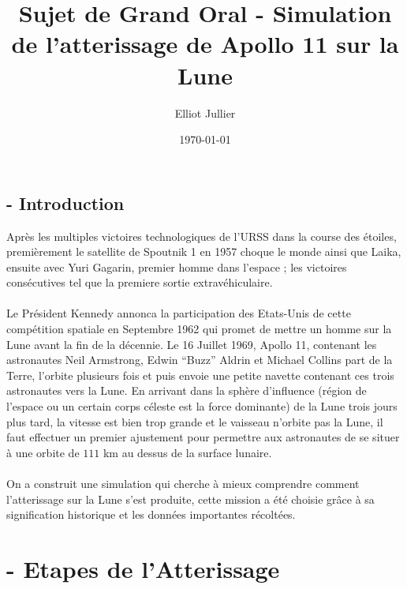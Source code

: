 \documentclass[a4paper, 12pt]{scrartcl}
\begin{document}
\title{Sujet de Grand Oral - Simulation de l'atterissage de Apollo 11 sur la Lune }
\author{Elliot Jullier}
\date{\today}
\maketitle

\tableofcontents

\newpage
{}




\subsection{- Introduction}
Après les multiples victoires technologiques de l'URSS dans la course des étoiles, premièrement le satellite de Spoutnik 1 en 1957 choque le monde ainsi que Laika, ensuite avec Yuri Gagarin, premier homme dans l'espace ; 
les victoires consécutives tel que la premiere sortie extravéhiculaire. 
\\
\\
\indent
Le Président Kennedy annonca la participation des Etats-Unis de cette compétition spatiale en 
Septembre 1962 qui promet de mettre un homme sur la Lune avant la fin de la décennie. 
Le 16 Juillet 1969, Apollo 11, contenant les astronautes Neil Armstrong, Edwin ``Buzz'' Aldrin et Michael Collins
part de la Terre, l'orbite plusieurs fois et puis envoie une petite navette contenant ces trois astronautes vers la Lune.
En arrivant dans la sphère d'influence (région de l'espace ou un certain corps céleste est la force dominante) de la Lune trois jours plus tard, la vitesse est bien trop grande et le vaisseau n'orbite pas la Lune, il faut effectuer un premier ajustement 
pour permettre aux astronautes de se situer à une orbite de $111$ km au dessus de la surface lunaire.
\\
\\
\indent
On a construit une simulation qui cherche à mieux comprendre comment l'atterissage sur la Lune
s'est produite, cette mission a été choisie grâce à sa signification historique et les
données importantes récoltées. 


\section{- Etapes de l'Atterissage}
\end{document}
